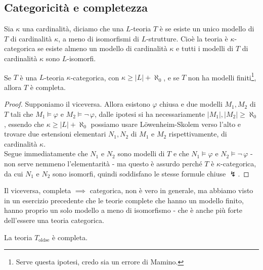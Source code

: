 \subsection{Categoricità e completezza}

\begin{definition}[Categoricità]
    Sia $\kappa$ una cardinalità, diciamo che una $L$-teoria $T$ è  se esiste un unico modello di $T$ di cardinalità $\kappa$, a meno di isomorfismi di $L$-strutture.
    Cioè la teoria è $\kappa$-categorica se esiste almeno un modello di cardinalità $\kappa$ e tutti i modelli di $T$ di cardinalità $\kappa$ sono $L$-isomorfi.
\end{definition}

\begin{proposition}
    Se $T$ è una $L$-teoria $\kappa$-categorica, con $\kappa \geq |L| + \aleph_0$, e se $T$ non ha modelli finiti\footnote{Serve questa ipotesi, credo sia un errore di Mamino.}, allora $T$ è completa.
\end{proposition}

\begin{proof}
    Supponiamo il viceversa. Allora esistono $\varphi$ chiusa e due modelli $M_1, M_2$ di $T$ tali che $M_1 \models \varphi$ e $M_2 \models \neg\, \varphi$, dalle ipotesi si ha necessariamente $|M_1|,|M_2| \geq \aleph_0$, essendo che $\kappa \geq |L| + \aleph_0$ possiamo usare Löwenheim-Skolem verso l'alto
    e trovare due estensioni elementari $N_1, N_2$ di $M_1$ e $M_2$ rispettivamente, di cardinalità $\kappa$.\\
    Segue immediatamente che $N_1$ e $N_2$ sono modelli di $T$ e che $N_1 \models \varphi$ e $N_2 \models \neg\, \varphi$ - non serve nemmeno l'elementarità - ma questo è assurdo perché $T$ è $\kappa$-categorica, da cui $N_1$ e $N_2$ sono isomorfi, quindi soddisfano le stesse formule chiuse $\lightning$.
\end{proof}

\begin{remark}
    Il viceversa, completa $\implies$ categorica, non è vero in generale, ma abbiamo visto in un esercizio precedente che le teorie complete che hanno un modello finito, hanno proprio un solo modello a meno di isomorfismo - che è anche più forte dell'essere una teoria categorica.
\end{remark}

\begin{exercise}
    La teoria $T_{\text{oldse}}$ è completa.
\end{exercise}

